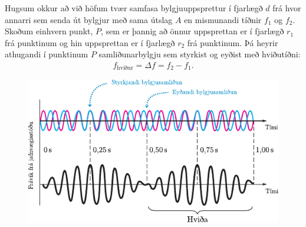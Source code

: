 \ifdefined \wholebook \else\documentclass[oneside]{book}\usepackage{EdlBook}\graphicspath{{figures/}}
\begin{document}
\begin{tcolorbox}
\begin{theorem}
Hugsum okkur að við höfum tvær samfasa bylgjuuppsprettur í fjarlægð $d$ frá hvor annarri sem senda út bylgjur með sama útslag $A$ en mismunandi tíðnir $f_1$ og $f_2$. Skoðum einhvern punkt, $P$, sem er þannig að önnur uppsprettan er í fjarlægð $r_1$ frá punktinum og hin uppsprettan er í fjarlægð $r_2$ frá punktinum. Þá heyrir athugandi í punktinum $P$ samliðunarbylgju sem styrkist og eyðist með hviðutíðni:
\begin{align*}
    f_{\text{hviður}} = \Delta f = f_2 - f_1.
\end{align*}
\begin{figure}[H]
    \centering
    \includegraphics{figures/hvidur.pdf}
\end{figure}
\end{theorem}
\end{tcolorbox}
\end{document}
